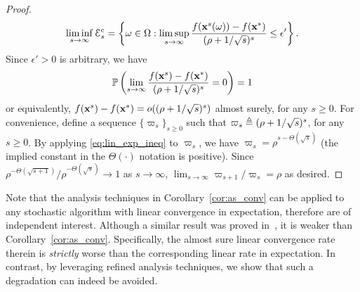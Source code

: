 \documentclass[10pt,twocolumn,journal]{IEEEtran}
\begin{document}
\begin{proof}
\begin{equation}
\liminf_{s\to\infty}\mathcal{E}_s^{\mathrm{c}}=\left\{\omega\in\Omega:\limsup_{s\to \infty}\frac{f(\mathbf{x}^s(\omega))-f(\mathbf{x}^*)}{(\rho+1/\sqrt{s})^s}\le\epsilon'\right\}.\nonumber 
\end{equation}
Since $\epsilon'>0$ is arbitrary, we have
\begin{equation}
\mathbb{P}\left(\lim_{s\to \infty}\frac{f(\mathbf{x}^s)-f(\mathbf{x}^*)}{(\rho+1/\sqrt{s})^s}=0\right)=1
\end{equation}
or equivalently, $f(\mathbf{x}^s)-f(\mathbf{x}^*)=o((\rho+1/\sqrt{s})^s)$ almost surely, for any $s\ge 0$. 
For convenience, define a sequence $\{\varpi_s\}_{s\ge 0}$ such that $\varpi_s\triangleq (\rho+1/\sqrt{s})^s$, for any $s\ge 0$. By applying \eqref{eq:lin_exp_ineq} to $\varpi_s$, we have $\varpi_s=\rho^{s - \Theta(\sqrt{s})}$ (the implied constant in the $\Theta(\cdot)$ notation is positive). Since $\rho^{ - \Theta(\sqrt{s+1}) }/\rho^{ - \Theta(\sqrt{s }) }\to 1$ as $s\to\infty$, $\lim_{s\to\infty} \varpi_{s+1}/\varpi_{s}=\rho$ as desired. %
\end{proof}

\begin{remark}\label{rmk:comp_Goldfarb}
Note that the analysis techniques in Corollary~\ref{cor:as_conv} can be applied to any stochastic algorithm with linear convergence in expectation, therefore are of independent interest. 
Although a similar result was proved in~\cite[Corollary~2]{Goldfarb_17},  %
it is weaker than Corollary~\ref{cor:as_conv}. Specifically, the almost sure linear convergence rate therein is {\em strictly} worse than the corresponding linear rate in expectation. In contrast, by leveraging refined analysis techniques, we show that such a degradation can indeed be avoided. 
\end{remark}



\end{document}
